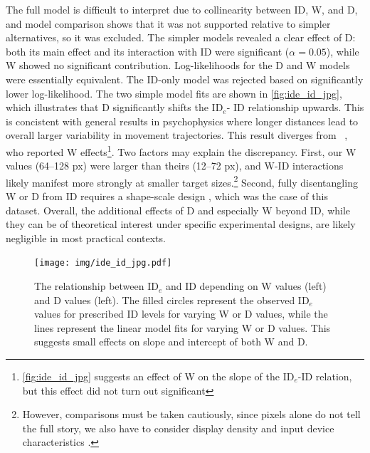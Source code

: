 \documentclass[acmlarge, manuscript,review]{acmart}
\newcommand{\ide}{\ensuremath{{\text{ID}_e}}\xspace}
\begin{document}
The full model is difficult to interpret due to collinearity between ID, W, and D, and model comparison shows that it was not supported relative to simpler alternatives, so it was excluded. The simpler models revealed a clear effect of D: both its main effect and its interaction with ID were significant ($\alpha=0.05$), while W showed no significant contribution. Log-likelihoods for the D and W models were essentially equivalent. The ID-only model was rejected based on significantly lower log-likelihood.
The two simple model fits are shown in \autoref{fig:ide_id_jpg}, which illustrates that D significantly shifts the \ide - ID relationship upwards. This is concistent with general results in psychophysics where longer distances lead to overall larger variability in movement trajectories. 
This result diverges from \citeauthor{zhai2004nominal}~\cite{zhai2004nominal}, who reported W effects\footnote{\autoref{fig:ide_id_jpg} suggests an effect of W on the slope of the \ide-ID relation, but this effect did not turn out significant}. Two factors may explain the discrepancy. First, our W values (64--128 px) were larger than theirs (12--72 px), and W-ID interactions likely manifest more strongly at smaller target sizes.\footnote{However, comparisons must be taken cautiously, since pixels alone do not tell the full story, we also have to consider display density and input device characteristics \cite{casiez2011}.} Second, fully disentangling W or D from ID requires a shape-scale design \cite{gori2018chi, guiard2009}, which was the case of this dataset.
Overall, the additional effects of D and especially W beyond ID, while they can be of theoretical interest under specific experimental designs, are likely negligible in most practical contexts.



\begin{figure}[htbp]
	\centering
	\texttt{[image: img/ide\_id\_jpg.pdf]}
	\caption{The relationship between \ide and ID depending on W values (left) and D values (left). The filled circles represent the observed \ide values for prescribed ID levels for varying W or D values, while the lines represent the linear model fits for varying W or D values. This suggests small effects on slope and intercept of both W and D.}
	\label{fig:ide_id_jpg}
\end{figure}
\end{document}
